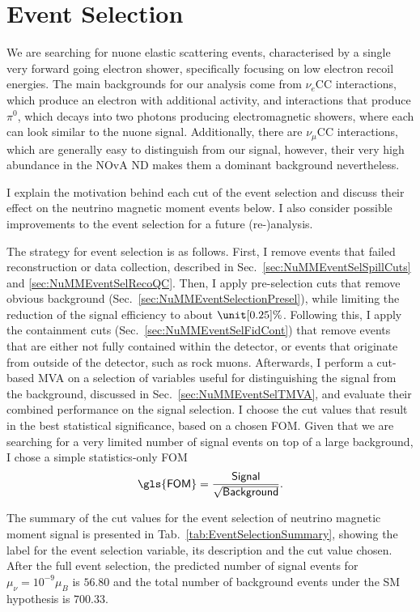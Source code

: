 \section{Event Selection}\label{sec:NuMMEventSelection}
We are searching for \gls{nuone} elastic scattering events, characterised by a single very forward going electron shower, specifically focusing on low electron recoil energies. The main backgrounds for our analysis come from $\nu_e$\gls{CC} interactions, which produce an electron with additional activity, and interactions that produce $\pi^0$, which decays into two photons producing electromagnetic showers, where each can look similar to the \gls{nuone} signal. Additionally, there are $\nu_\mu$\gls{CC} interactions, which are generally easy to distinguish from our signal, however, their very high abundance in the \gls{NOvA} \gls{ND} makes them a dominant background nevertheless.

I explain the motivation behind each cut of the event selection and discuss their effect on the neutrino magnetic moment events below. I also consider possible improvements to the event selection for a future (re-)analysis.

The strategy for event selection is as follows. First, I remove events that failed reconstruction or data collection, described in Sec.~\ref{sec:NuMMEventSelSpillCuts} and \ref{sec:NuMMEventSelRecoQC}. Then, I apply pre-selection cuts that remove obvious background (Sec.~\ref{sec:NuMMEventSelectionPresel}), while limiting the reduction of the signal efficiency to about $\unit[0.25]{\%}$. Following this, I apply the containment cuts (Sec.~\ref{sec:NuMMEventSelFidCont}) that remove events that are either not fully contained within the detector, or events that originate from outside of the detector, such as rock muons. Afterwards, I perform a cut-based \gls{MVA} on a selection of variables useful for distinguishing the signal from the background, discussed in Sec.~\ref{sec:NuMMEventSelTMVA}, and evaluate their combined performance on the signal selection. I choose the cut values that result in the best statistical significance, based on a chosen \gls{FOM}. Given that we are searching for a very limited number of signal events on top of a large background, I chose a simple statistics-only \gls{FOM}
\begin{equation}\label{eq:NuMMFOM}
\textsf{\gls{FOM}} = \frac{\textsf{Signal}}{\sqrt{\textsf{Background}}}.
\end{equation}

The summary of the cut values for the event selection of neutrino magnetic moment signal is presented in Tab.~\ref{tab:EventSelectionSummary}, showing the label for the event selection variable, its description and the cut value chosen. After the full event selection, the predicted number of signal events for $\mu_\nu=10^{-9}\mu_B$ is $56.80$ and the total number of background events under the \gls{SM} hypothesis is $700.33$.

